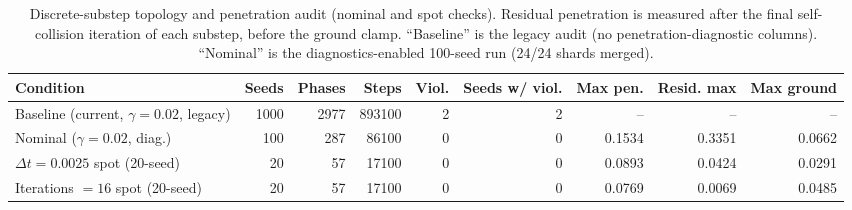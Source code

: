 
\begin{table}[t]
  \centering
  \small
  \setlength{\tabcolsep}{4pt}
  \caption{Discrete-substep topology and penetration audit (nominal and spot checks). Residual penetration is measured after the final self-collision iteration of each substep, before the ground clamp. ``Baseline'' is the legacy audit (no penetration-diagnostic columns). ``Nominal'' is the diagnostics-enabled 100-seed run (24/24 shards merged).}
  \label{tab:topology-audit}
  \begin{tabular}{lrrrrrrrr}
    \hline
    Condition & Seeds & Phases & Steps & Viol. & Seeds w/ viol. & Max pen. & Resid. max & Max ground \\
    \hline
    Baseline (current, $\gamma{=}0.02$, legacy) & 1000 & 2977 & 893100 & 2 & 2 & -- & -- & -- \\
    Nominal ($\gamma{=}0.02$, diag.) & 100 & 287 & 86100 & 0 & 0 & 0.1534 & 0.3351 & 0.0662 \\
    $\Delta t{=}0.0025$ spot (20-seed) & 20 & 57 & 17100 & 0 & 0 & 0.0893 & 0.0424 & 0.0291 \\
    Iterations $=16$ spot (20-seed) & 20 & 57 & 17100 & 0 & 0 & 0.0769 & 0.0069 & 0.0485 \\
    \hline
  \end{tabular}
\end{table}

